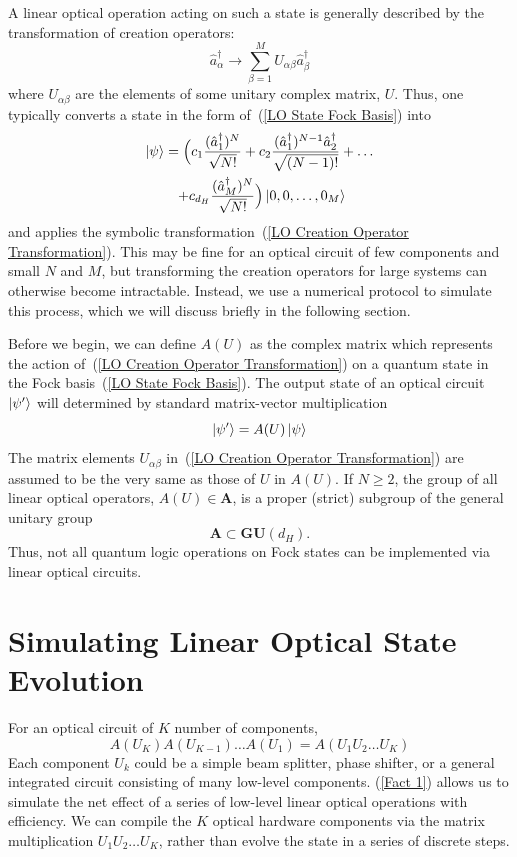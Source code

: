 \documentclass[aps,pra,twocolumn,showpacs,superscriptaddress,floatfix,10pt]{revtex4}
\begin{document}
A linear optical operation acting on such a state is generally described by the transformation of creation operators:
\begin{equation}
\label{LO Creation Operator Transformation}
\hat{a}^\dagger_\alpha \rightarrow \sum_{\beta=1}^{M} U_{\alpha\beta} \hat{a}^\dagger_\beta
\end{equation}
where $U_{\alpha \beta}$ are the elements of some unitary complex matrix, $U$. Thus, one typically converts a state in the form of~(\ref{LO State Fock Basis}) into
\begin{eqnarray}
\ket{\psi} = \Big(c_1 \frac{(\hat{a}^\dagger_1)^N}{\sqrt{N!}} + c_2 \frac{ (\hat{a}^\dagger_1)^{N-1} \hat{a}^\dagger_2}{\sqrt{(N-1)!}} + \dots \\* + c_{d_H} \frac{(\hat{a}^\dagger_M)^N}{\sqrt{N!}}\Big) \ket{0,0,\dots,0_M} \quad \quad \nonumber
\end{eqnarray}
and applies the symbolic transformation~(\ref{LO Creation Operator Transformation}). This may be fine for an optical circuit of few components and small $N$ and $M$, but transforming the creation operators for large systems can otherwise become intractable. Instead, we use a numerical protocol to simulate this process, which we will discuss briefly in the following section.

Before we begin, we can define $A(U)$ as the complex matrix which represents the action of~(\ref{LO Creation Operator Transformation}) on a quantum state in the Fock basis~(\ref{LO State Fock Basis}). The output state of an optical circuit $\ket{\psi^\prime}$ will determined by standard matrix-vector multiplication
\begin{equation}
\label{Matrix Vector Product}
\ket{\psi^\prime} = A(U) \ket{\psi}
\end{equation}
The matrix elements $U_{\alpha \beta}$ in~(\ref{LO Creation Operator Transformation}) are assumed to be the very same as those of $U$ in $A(U)$. If $N \ge 2$, the group of all linear optical operators, $ A(U) \in \textbf{A}$, is a proper (strict) subgroup of the general unitary group
\begin{equation}
\label{Proper Subgroup}
\textbf{A} \subset \textbf{GU}(d_H).
\end{equation}
Thus, not all quantum logic operations on Fock states can be implemented via linear optical circuits.
\section{Simulating Linear Optical State Evolution}
\label{Section of Facts}
For an optical circuit of $K$ number of components,
\begin{equation}
	\label{Fact 1}
A(U_K) A(U_{K-1}) \dots A(U_1) = A(U_1 U_2 \dots U_K)
\end{equation}
Each component $U_k$ could be a simple beam splitter, phase shifter, or a general integrated circuit consisting of many low-level components.
(\ref{Fact 1}) allows us to simulate the net effect of a series of low-level linear optical operations with efficiency. We can compile the $K$ optical hardware components via the matrix multiplication $U_1 U_2 \dots U_K$, rather than evolve the state in a series of discrete steps.
\end{document}
